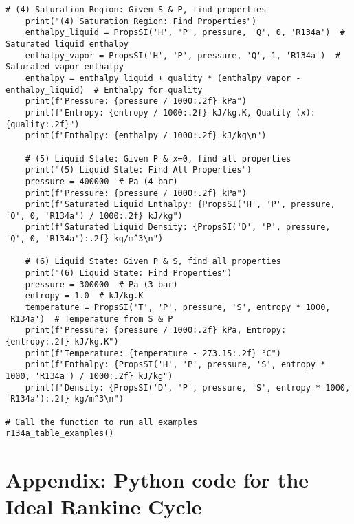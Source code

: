 \documentclass[11pt]{article}
\begin{document}
\begin{lstlisting}[style=custompython, caption=Python code for thermodynamic properties of R134a]
    # (4) Saturation Region: Given S & P, find properties
    print("(4) Saturation Region: Find Properties")
    enthalpy_liquid = PropsSI('H', 'P', pressure, 'Q', 0, 'R134a')  # Saturated liquid enthalpy
    enthalpy_vapor = PropsSI('H', 'P', pressure, 'Q', 1, 'R134a')  # Saturated vapor enthalpy
    enthalpy = enthalpy_liquid + quality * (enthalpy_vapor - enthalpy_liquid)  # Enthalpy for quality
    print(f"Pressure: {pressure / 1000:.2f} kPa")
    print(f"Entropy: {entropy / 1000:.2f} kJ/kg.K, Quality (x): {quality:.2f}")
    print(f"Enthalpy: {enthalpy / 1000:.2f} kJ/kg\n")

    # (5) Liquid State: Given P & x=0, find all properties
    print("(5) Liquid State: Find All Properties")
    pressure = 400000  # Pa (4 bar)
    print(f"Pressure: {pressure / 1000:.2f} kPa")
    print(f"Saturated Liquid Enthalpy: {PropsSI('H', 'P', pressure, 'Q', 0, 'R134a') / 1000:.2f} kJ/kg")
    print(f"Saturated Liquid Density: {PropsSI('D', 'P', pressure, 'Q', 0, 'R134a'):.2f} kg/m^3\n")

    # (6) Liquid State: Given P & S, find all properties
    print("(6) Liquid State: Find Properties")
    pressure = 300000  # Pa (3 bar)
    entropy = 1.0  # kJ/kg.K
    temperature = PropsSI('T', 'P', pressure, 'S', entropy * 1000, 'R134a')  # Temperature from S & P
    print(f"Pressure: {pressure / 1000:.2f} kPa, Entropy: {entropy:.2f} kJ/kg.K")
    print(f"Temperature: {temperature - 273.15:.2f} °C")
    print(f"Enthalpy: {PropsSI('H', 'P', pressure, 'S', entropy * 1000, 'R134a') / 1000:.2f} kJ/kg")
    print(f"Density: {PropsSI('D', 'P', pressure, 'S', entropy * 1000, 'R134a'):.2f} kg/m^3\n")

# Call the function to run all examples
r134a_table_examples()
\end{lstlisting}


\newpage
\section{Appendix: Python code for the Ideal Rankine Cycle}
\end{document}
